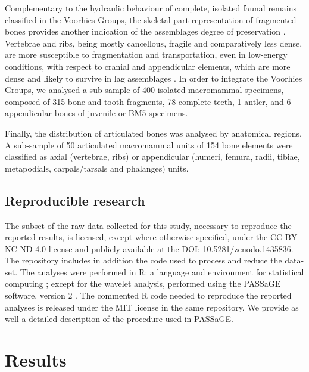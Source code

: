 \documentclass[5p,times,authoryear]{elsarticle}
\begin{document}
Complementary to the hydraulic behaviour of complete, isolated faunal remains classified in the Voorhies Groups, the skeletal part representation of fragmented bones provides another indication of the assemblages degree of preservation \citep{Dominguez-Rodrigo2014,Dominguez-Rodrigo2017,Pante2010}. Vertebrae and ribs, being mostly cancellous, fragile and comparatively less dense, are more susceptible to fragmentation and transportation, even in low-energy conditions, with respect to cranial and appendicular elements, which are more dense and likely to survive in lag assemblages \citep{Dominguez-Rodrigo2017}. In order to integrate the Voorhies Groups, we analysed a sub-sample of 400 isolated macromammal specimens, composed of 315 bone and tooth fragments, 78 complete teeth, 1 antler, and 6 appendicular bones of juvenile or BM5 specimens.

Finally, the distribution of articulated bones was analysed by anatomical regions. A sub-sample of 50 articulated macromammal units of 154 bone elements were classified as axial (vertebrae, ribs) or appendicular (humeri, femura, radii, tibiae, metapodials, carpals/tarsals and phalanges) units.

\subsection{Reproducible research}

The subset of the raw data collected for this study, necessary to reproduce the reported results, is licensed, except where otherwise specified, under the CC-BY-NC-ND-4.0 license and publicly available at the DOI: \href{https://doi.org/10.5281/zenodo.1435836}{10.5281/zenodo.1435836}. The repository includes in addition the code used to process and reduce the data-set.
The analyses were performed in \textsf{R}: a language and environment for statistical computing \citep{RCoreTeam2017}; except for the wavelet analysis, performed using the PASSaGE software, version 2 \citep{Rosenberg2011}. The commented \textsf{R} code needed to reproduce the reported analyses is released under the MIT license in the same repository. We provide as well a detailed description of the procedure used in PASSaGE.

\section{Results}
\end{document}
